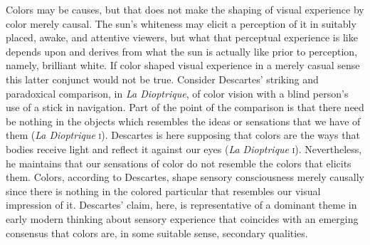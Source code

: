 Colors may be causes, but that does not make the shaping of visual experience by color merely causal. The sun's whiteness may elicit a perception of it in suitably placed, awake, and attentive viewers, but what that perceptual experience is like depends upon and derives from what the sun is actually like prior to perception, namely, brilliant white. If color shaped visual experience in a merely casual sense this latter conjunct would not be true. Consider Descartes' striking and paradoxical comparison, in \emph{La Dioptrique}, of color vision with a blind person's use of a stick in navigation. Part of the point of the comparison is that there need be nothing in the objects which resembles the ideas or sensations that we have of them (\emph{La Dioptrique} \textsc{i}). Descartes is here supposing that colors are the ways that bodies receive light and reflect it against our eyes (\emph{La Dioptrique} \textsc{i}). Nevertheless, he maintains that our sensations of color do not resemble the colors that elicits them. Colors, according to Descartes, shape sensory consciousness merely causally since there is nothing in the colored particular that resembles our visual impression of it. Descartes' claim, here, is representative of a dominant theme in early modern thinking about sensory experience that coincides with an emerging consensus that colors are, in some suitable sense, secondary qualities.


